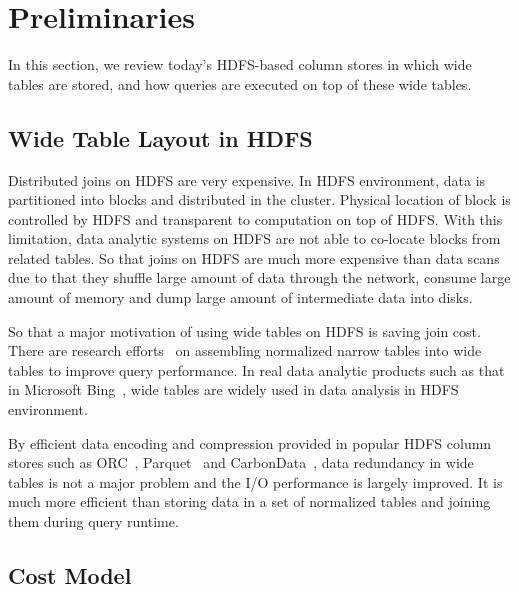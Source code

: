\section{Preliminaries}

In this section, we review today's HDFS-based column stores in which wide tables are stored, and how queries are executed on top of these wide tables.

\subsection{Wide Table Layout in HDFS}

Distributed joins on HDFS are very expensive.
In HDFS environment, data is partitioned into blocks and distributed in the cluster. 
Physical location of block is controlled by HDFS and transparent to computation on top of HDFS.
With this limitation, data analytic systems on HDFS are not able to co-locate blocks from related tables.
So that joins on HDFS are much more expensive than data scans due to that they shuffle large amount of data through the network, consume large amount of memory and dump large amount of intermediate data into disks.

So that a major motivation of using wide tables on HDFS is saving join cost.
There are research efforts~\cite{WideTable:paper} on assembling normalized narrow tables into wide tables to improve query performance.
In real data analytic products such as that in Microsoft Bing~\cite{ColumnOrdering}, wide tables are widely used in data analysis in HDFS environment.

By efficient data encoding and compression provided in popular HDFS column stores such as ORC~\cite{ORCMainPage}, Parquet~\cite{parquetMainPage} and CarbonData~\cite{CarbonDataMainPage}, data redundancy in wide tables is not a major problem and the I/O performance is largely improved.
It is much more efficient than storing data in a set of normalized tables and joining them during query runtime.


\subsection{Cost Model}

